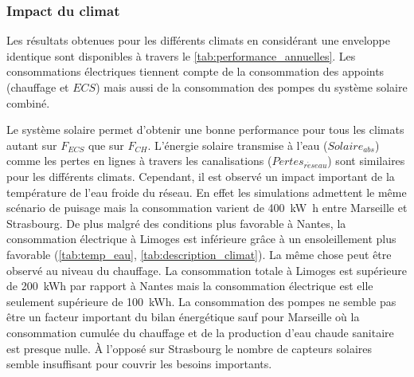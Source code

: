 \subsubsection{Impact du climat} %
\label{ssub:impact_du_climat}
Les résultats obtenues pour les différents climats en considérant une enveloppe identique
sont disponibles à travers le \autoref{tab:performance_annuelles}. Les consommations
électriques tiennent compte de la consommation des appoints (chauffage et $ECS$) mais aussi
de la consommation des pompes du système solaire combiné.

Le système solaire permet d’obtenir une bonne performance pour tous les climats autant sur
$F_{ECS}$ que sur $F_{CH}$. L’énergie solaire transmise à l’eau ($Solaire_{abs}$) comme
les pertes en lignes à travers les canalisations ($Pertes_{r\acute eseau}$) sont similaires pour
les différents climats. Cependant, il est observé un impact important de la température
de l’eau froide du réseau. En effet les simulations admettent le même scénario de puisage
mais la consommation varient de \SI{400}{\kilo\watt\hour} entre Marseille et Strasbourg.
De plus malgré des conditions plus favorable à Nantes, la consommation électrique à
Limoges est inférieure grâce à un ensoleillement plus favorable (\autoref{tab:temp_eau},
\autoref{tab:description_climat}). La même chose peut être observé au niveau du chauffage.
La consommation totale à Limoges est supérieure de \SI{200}{kWh} par rapport à Nantes mais
la consommation électrique est elle seulement supérieure de \SI{100}{kWh}.
La consommation des pompes ne semble pas être un facteur important du bilan énergétique sauf pour
Marseille où la consommation cumulée du chauffage et de la
production d’eau chaude sanitaire est presque nulle. À l’opposé sur Strasbourg le nombre
de capteurs solaires semble insuffisant pour couvrir les besoins importants.


